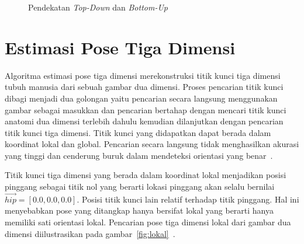 \begin{figure}[htbp]
    \begin{center}
    \end{center}
    \vspace{-20pt}
    \captionsetup{labelfont=bf, textfont=bf}
    \caption{Pendekatan \textit{Top-Down} dan \textit{Bottom-Up}}
    \vspace{-10pt}
    \captionsetup{labelfont=md, textfont=md}
    \label{fig:tdbu}
\end{figure}

\section{Estimasi Pose Tiga Dimensi}
\label{sec:2-EstimasiPoseTigaDimensi}

Algoritma estimasi pose tiga dimensi merekonstruksi titik kunci tiga dimensi tubuh manusia dari
sebuah gambar dua dimensi. Proses pencarian titik kunci dibagi menjadi dua golongan yaitu pencarian
secara langsung menggunakan gambar sebagai masukkan dan pencarian bertahap dengan mencari titik kunci
anatomi dua dimensi terlebih dahulu kemudian dilanjutkan dengan pencarian titik kunci tiga dimensi.
Titik kunci yang didapatkan dapat berada dalam koordinat lokal dan global.
Pencarian secara langsung tidak menghasilkan akurasi yang tinggi dan cenderung buruk dalam mendeteksi
orientasi yang benar~\cite{2020arXiv200210322C}.

Titik kunci tiga dimensi yang berada dalam koordinat lokal menjadikan posisi pinggang sebagai titik
nol yang berarti lokasi pinggang akan selalu bernilai $\vec{hip} = [0.0, 0.0, 0.0]$. Posisi titik
kunci lain relatif terhadap titik pinggang. Hal ini menyebabkan pose yang ditangkap hanya bersifat
lokal yang berarti hanya memiliki sati orientasi lokal. Pencarian pose tiga dimensi lokal dari gambar
dua dimensi diilustrasikan pada gambar~\ref{fig:lokal}~\cite{martinez_2017_3dbaseline}.

